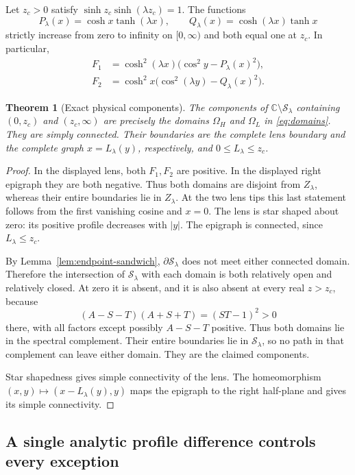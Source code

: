 \documentclass[11pt]{article}
\numberwithin{equation}{section}
\newtheorem{theorem}{Theorem}[section]
\theoremstyle{definition}
\newcommand{\C}{\mathbb C}
\newcommand{\cS}{\mathcal S}
\newcommand{\OH}{\Omega_H}
\newcommand{\OL}{\Omega_L}
\begin{document}
Let $z_c>0$ satisfy $\sinh z_c\sinh(\lambda z_c)=1$.
The functions
\[
 P_\lambda(x)=\cosh x\tanh(\lambda x),\qquad
 Q_\lambda(x)=\cosh(\lambda x)\tanh x
\]
strictly increase from zero to infinity on $[0,\infty)$ and
both equal one at $z_c$.  In particular,
\begin{align*}
 F_1&=\cosh^2(\lambda x)
              \bigl(\cos^2y-P_\lambda(x)^2\bigr),\\
 F_2&=\cosh^2x
              \bigl(\cos^2(\lambda y)-Q_\lambda(x)^2\bigr).
\end{align*}

\begin{theorem}[Exact physical components]\label{thm:components}
The components of $\C\setminus\cS_\lambda$ containing
$(0,z_c)$ and $(z_c,\infty)$ are precisely the domains
$\OH$ and $\OL$ in \eqref{eq:domains}.  They are simply connected.
Their boundaries are the complete lens boundary and the complete
graph $x=L_\lambda(y)$, respectively, and $0\le L_\lambda\le z_c$.
\end{theorem}
\begin{proof}
In the displayed lens, both $F_1,F_2$ are positive.
In the displayed right epigraph they are both negative.
Thus both domains are disjoint from $Z_\lambda$, whereas their
entire boundaries lie in $Z_\lambda$.  At the two lens tips this
last statement follows from the first vanishing cosine and $x=0$.
The lens is star shaped about zero: its positive profile decreases
with $|y|$.  The epigraph is connected, since $L_\lambda\le z_c$.

By Lemma~\ref{lem:endpoint-sandwich}, $\partial\cS_\lambda$ does
not meet either connected domain.  Therefore the intersection of
$\cS_\lambda$ with each domain is both relatively open and relatively closed.
At zero it is absent, and it is also absent at every real $z>z_c$,
because
\[
 (A-S-T)(A+S+T)=(ST-1)^2>0
\]
there, with all factors except possibly $A-S-T$ positive.
Thus both domains lie in the spectral complement.  Their entire
boundaries lie in $\cS_\lambda$, so no path in that complement can
leave either domain.  They are the claimed components.

Star shapedness gives simple connectivity of the lens.  The
homeomorphism $(x,y)\mapsto(x-L_\lambda(y),y)$ maps the epigraph
to the right half-plane and gives its simple connectivity.
\end{proof}

\subsection{A single analytic profile difference controls every exception}
\end{document}
